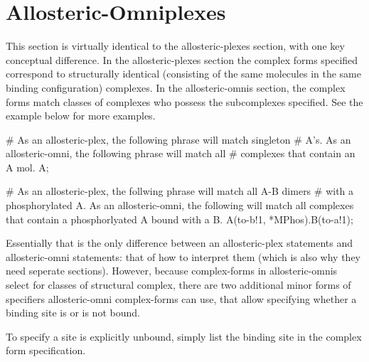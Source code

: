 \section{Allosteric-Omniplexes}
This section is virtually identical to the allosteric-plexes section,
with one key conceptual difference.  In the allosteric-plexes section
the complex forms specified correspond to structurally identical
(consisting of the same molecules in the same binding configuration)
complexes.  In the allosteric-omnis section, the complex forms match
classes of complexes who possess the subcomplexes specified.  See the
example below for more examples.


\begin{ExampleMZR}

# As an allosteric-plex, the following phrase will match singleton
# A's.  As an allosteric-omni, the following phrase will match all
# complexes that contain an A mol.
A; 

# As an allosteric-plex, the follwing phrase will match all A-B dimers 
# with a phosphorylated A.  As an allosteric-omni, the following will
match all complexes that contain a phosphorlyated A bound with a B.
A(to-b!1, *M{Phos}).B(to-a!1);

\end{ExampleMZR}

Essentially that is the only difference between an allosteric-plex
statements and allosteric-omni statements: that of how to interpret
them (which is also why they need seperate sections).  However,
because complex-forms in allosteric-omnis select for classes of
structural complex, there are two additional minor forms of
specifiers allosteric-omni complex-forms can use, that allow specifying
whether a binding site is or is not bound.  

To specify a site is explicitly unbound, simply list the binding site in the
complex form specification.

